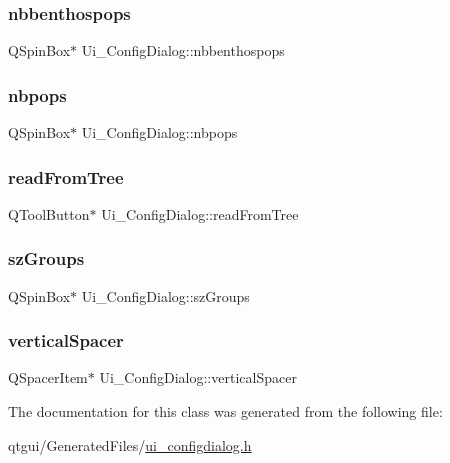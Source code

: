 \subsubsection{\texorpdfstring{nbbenthospops}{nbbenthospops}}
{\footnotesize\ttfamily Q\+Spin\+Box$\ast$ Ui\+\_\+\+Config\+Dialog\+::nbbenthospops}

\mbox{\label{class_ui___config_dialog_a5ea2736bb347b9bccd6317ce7ea83d6c}} 
\subsubsection{\texorpdfstring{nbpops}{nbpops}}
{\footnotesize\ttfamily Q\+Spin\+Box$\ast$ Ui\+\_\+\+Config\+Dialog\+::nbpops}

\mbox{\label{class_ui___config_dialog_a3209c750f7bbb8f66fc3b44eb23f0510}} 
\subsubsection{\texorpdfstring{readFromTree}{readFromTree}}
{\footnotesize\ttfamily Q\+Tool\+Button$\ast$ Ui\+\_\+\+Config\+Dialog\+::read\+From\+Tree}

\mbox{\label{class_ui___config_dialog_a02c05abff3afc37b2043e28eb847cbfe}} 
\subsubsection{\texorpdfstring{szGroups}{szGroups}}
{\footnotesize\ttfamily Q\+Spin\+Box$\ast$ Ui\+\_\+\+Config\+Dialog\+::sz\+Groups}

\mbox{\label{class_ui___config_dialog_ac409e2fd88b71f3aaa6de087b3f5eb94}} 
\subsubsection{\texorpdfstring{verticalSpacer}{verticalSpacer}}
{\footnotesize\ttfamily Q\+Spacer\+Item$\ast$ Ui\+\_\+\+Config\+Dialog\+::vertical\+Spacer}



The documentation for this class was generated from the following file\+:\begin{DoxyCompactItemize}
\item 
qtgui/\+Generated\+Files/\mbox{\hyperlink{ui__configdialog_8h}{ui\+\_\+configdialog.\+h}}\end{DoxyCompactItemize}
